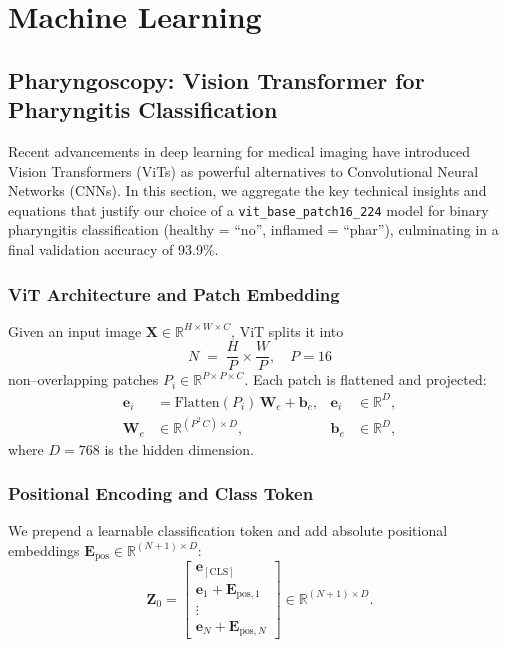 \chapter{Machine Learning}

\section{Pharyngoscopy: Vision Transformer for Pharyngitis Classification}

Recent advancements in deep learning for medical imaging have introduced Vision Transformers (ViTs) as powerful alternatives to Convolutional Neural Networks (CNNs). In this section, we aggregate the key technical insights and equations that justify our choice of a \texttt{vit\_base\_patch16\_224} model for binary pharyngitis classification (healthy = “no”, inflamed = “phar”), culminating in a final validation accuracy of 93.9\%.

\subsection{ViT Architecture and Patch Embedding}
Given an input image \(\mathbf{X}\in\mathbb{R}^{H\times W\times C}\), ViT splits it into
\[
  N \;=\;\frac{H}{P}\times\frac{W}{P},
  \quad P=16
\]
non–overlapping patches \(P_i\in\mathbb{R}^{P\times P\times C}\). Each patch is flattened and projected:
\[
  \begin{aligned}
    \mathbf{e}_i &= \mathrm{Flatten}(P_i)\,\mathbf{W}_e + \mathbf{b}_e, 
      &\mathbf{e}_i &\in \mathbb{R}^D,\\
    \mathbf{W}_e &\in \mathbb{R}^{(P^2\,C)\times D}, 
      &\mathbf{b}_e &\in \mathbb{R}^D,
  \end{aligned}
\]
where \(D=768\) is the hidden dimension.

\subsection{Positional Encoding and Class Token}
We prepend a learnable classification token and add absolute positional embeddings \(\mathbf{E}_{\mathrm{pos}}\in\mathbb{R}^{(N+1)\times D}\):
\[
  \mathbf{Z}_0
  = 
  \begin{bmatrix}
    \mathbf{e}_{\mathrm{[CLS]}} \\[6pt]
    \mathbf{e}_1 + \mathbf{E}_{\mathrm{pos},1} \\[3pt]
    \vdots \\[3pt]
    \mathbf{e}_N + \mathbf{E}_{\mathrm{pos},N}
  \end{bmatrix}
  \in \mathbb{R}^{(N+1)\times D}.
\]

